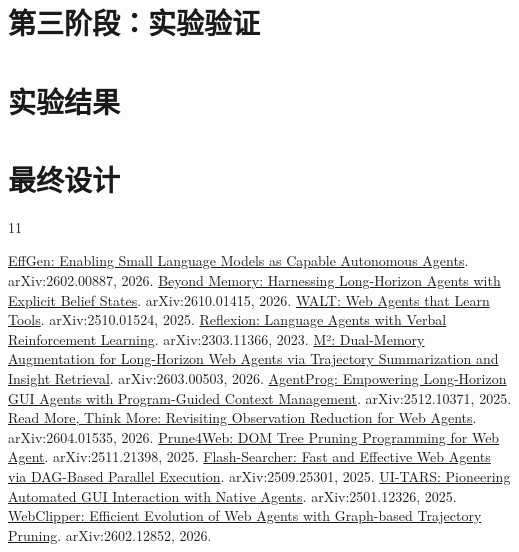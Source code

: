 \documentclass[UTF8,zihao=5,fontset=windows,a4paper]{ctexart}
\begin{document}
\section{第三阶段：实验验证}
\vspace{5mm}
\section{实验结果}
\vspace{5mm}
\section{最终设计}
\vspace{5mm}

\vspace{1pt}
\begingroup
\renewcommand{\refname}{参考文献}
\linespread{1.0}
\fontsize{9.3}{13.2}\selectfont
\setlength{\parskip}{0pt}
\begin{thebibliography}{11}
\raggedright
\setlength{\itemsep}{3pt}
\setlength{\parsep}{0pt}
 \href{https://arxiv.org/abs/2602.00887}{EffGen: Enabling Small Language Models as Capable Autonomous Agents}. arXiv:2602.00887, 2026.
 \href{https://arxiv.org/abs/2610.01415}{Beyond Memory: Harnessing Long-Horizon Agents with Explicit Belief States}. arXiv:2610.01415, 2026.
 \href{https://arxiv.org/abs/2510.01524}{WALT: Web Agents that Learn Tools}. arXiv:2510.01524, 2025.
 \href{https://arxiv.org/abs/2303.11366}{Reflexion: Language Agents with Verbal Reinforcement Learning}. arXiv:2303.11366, 2023.
 \href{https://arxiv.org/abs/2603.00503}{M²: Dual-Memory Augmentation for Long-Horizon Web Agents via Trajectory Summarization and Insight Retrieval}. arXiv:2603.00503, 2026.
 \href{https://arxiv.org/abs/2512.10371}{AgentProg: Empowering Long-Horizon GUI Agents with Program-Guided Context Management}. arXiv:2512.10371, 2025.
 \href{https://arxiv.org/abs/2604.01535}{Read More, Think More: Revisiting Observation Reduction for Web Agents}. arXiv:2604.01535, 2026.
 \href{https://arxiv.org/abs/2511.21398}{Prune4Web: DOM Tree Pruning Programming for Web Agent}. arXiv:2511.21398, 2025.
 \href{https://arxiv.org/abs/2509.25301}{Flash-Searcher: Fast and Effective Web Agents via DAG-Based Parallel Execution}. arXiv:2509.25301, 2025.
 \href{https://arxiv.org/abs/2501.12326}{UI-TARS: Pioneering Automated GUI Interaction with Native Agents}. arXiv:2501.12326, 2025.
 \href{https://arxiv.org/abs/2602.12852}{WebClipper: Efficient Evolution of Web Agents with Graph-based Trajectory Pruning}. arXiv:2602.12852, 2026.
\end{thebibliography}
\endgroup
\end{document}
